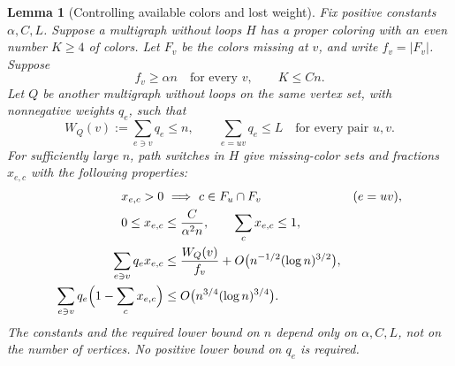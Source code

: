 \documentclass[11pt]{article}
\newtheorem{lemma}[theorem]{Lemma}
\theoremstyle{definition}\newtheorem{algorithm}{Algorithm}[section]
\numberwithin{equation}{section}
\theoremstyle{remark}\newtheorem*{remark}{Remark}
\begin{document}
\begin{lemma}[Controlling available colors and lost weight]\label{lem:weighted-moment-mix}
Fix positive constants $\alpha,C,L$. Suppose a multigraph without loops $H$
has a proper coloring with an even number $K\ge4$ of colors. Let $F_v$
be the colors missing at $v$, and write $f_v=|F_v|$. Suppose
\[
 f_v\ge\alpha n\quad\text{for every }v,\qquad K\le Cn.
\]
Let $Q$ be another multigraph without loops on the same vertex set, with
nonnegative weights $q_e$, such that
\[
 W_Q(v):=\sum_{e\ni v}q_e\le n,\qquad
 \sum_{e=uv}q_e\le L\quad\text{for every pair }u,v.
\]
For sufficiently large $n$, path switches in $H$ give missing-color sets
and fractions $x_{e,c}$ with the following properties:
\begin{align}
 x_{e,c}>0&\ \Longrightarrow\ c\in F_u\cap F_v
                      &&(e=uv),\label{eq:moment-support}\\
 0\le x_{e,c}&\le \frac{C}{\alpha^2n},\qquad
 \sum_cx_{e,c}\le1,\label{eq:moment-small}\\
 \sum_{e\ni v}q_ex_{e,c}
 &\le\frac{W_Q(v)}{f_v}
       +O\bigl(n^{-1/2}(\log n)^{3/2}\bigr),
                       \label{eq:moment-load}\\
 \sum_{e\ni v}q_e\Bigl(1-\sum_cx_{e,c}\Bigr)
 &\le O\bigl(n^{3/4}(\log n)^{3/4}\bigr).
                       \label{eq:moment-loss}
\end{align}
The constants and the required lower bound on $n$ depend only on
$\alpha,C,L$, not on the number of vertices. No positive lower bound on
$q_e$ is required.
\end{lemma}
\end{document}
